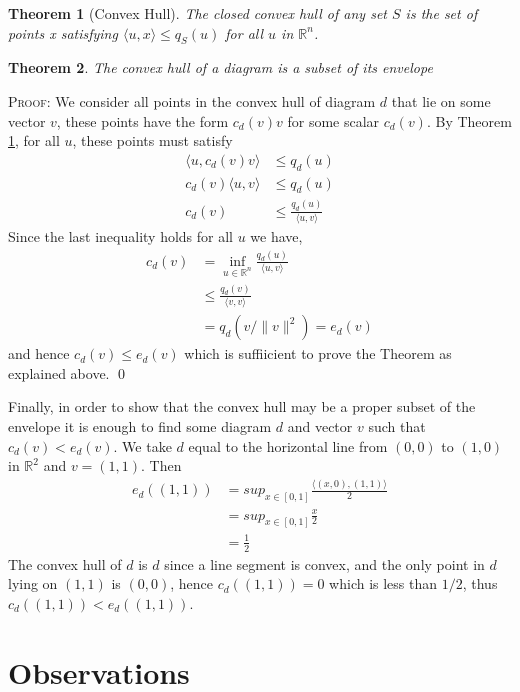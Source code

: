 \documentclass[11pt]{amsart}
\newtheorem{thm}{Theorem}
\begin{document}
\begin{thm}[Convex Hull]
\label{convexhull} The closed convex hull of any set $S$ is the set of points x satisfying $\langle u, x \rangle \leq q_S(u)$ for all $u$ in $\mathbb{R}^n$.
\end{thm}

\begin{thm}
The convex hull of a diagram is a subset of its envelope
\end{thm}
\textsc{Proof}: We consider all points in the convex hull of diagram $d$ that lie on some vector $v$, these points have the form $c_d(v)v$ for some
scalar $c_d(v)$. By Theorem \ref{convexhull}, for all $u$, these points must satisfy
\begin{align}
\langle u, c_d(v)v \rangle &\leq q_d(u)\\
c_d(v)\langle u, v \rangle &\leq q_d(u)\\
c_d(v) &\leq  \frac{q_d(u)}{\langle u, v \rangle}
\end{align}
Since the last inequality holds for all $u$ we have,
\begin{align}
c_d(v) &= \inf_{u \in \mathbb{R}^n}  \frac{q_d(u)}{\langle u, v \rangle}\\
&\leq \frac{q_d(v)}{\langle v, v \rangle} \\
&= q_d(v/\|v\|^2)= e_d(v) 
\end{align}
 and hence $c_d(v) \leq e_d(v)$ which is suffiicient to prove the Theorem as explained above. \qed
 
 Finally, in order to show that the convex hull may be a proper subset of the envelope it is enough to find some diagram $d$ and vector $v$ such that
 $c_d(v) < e_d(v)$. We take $d$ equal to the horizontal line from $(0,0)$ to $(1,0)$ in $\mathbb{R}^2$ and $v=(1,1)$. Then
 \begin{align}
 e_d((1,1)) &= sup_{x \in [0,1]} \frac{\langle (x,0), (1,1) \rangle}{2}\\
                 &= sup_{x \in [0,1]} \frac{x}{2}\\
                 &= \frac{1}{2}
\end{align}
The convex hull of $d$ is $d$ since a line segment is convex, and the only point in $d$ lying on $(1,1)$ is $(0,0)$, hence $c_d((1,1)) = 0$ which is less than 
$1/2$, thus $c_d((1,1)) < e_d((1,1))$.

\section{Observations}
\end{document}
